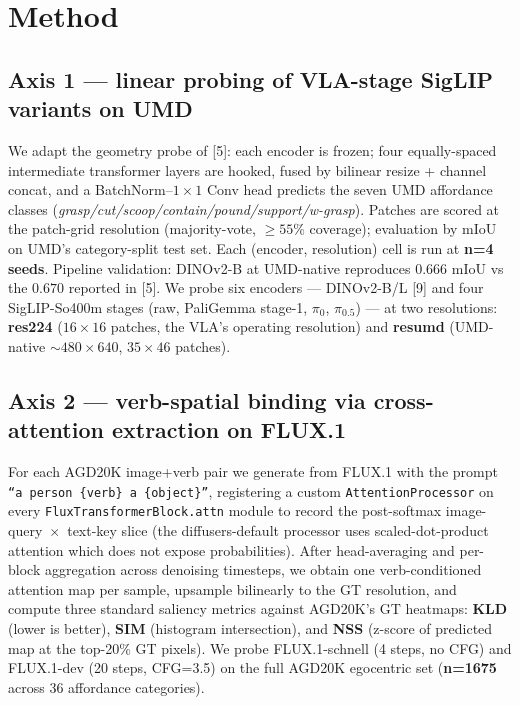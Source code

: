 \documentclass[11pt,letterpaper]{article}
\begin{document}
\section{Method}

\subsection{Axis 1 — linear probing of VLA-stage SigLIP variants on UMD}
We adapt the geometry probe of [5]: each encoder is frozen; four equally-spaced intermediate transformer layers are hooked, fused by bilinear resize + channel concat, and a BatchNorm--$1{\times}1$ Conv head predicts the seven UMD affordance classes (\emph{grasp/cut/scoop/contain/pound/support/w-grasp}). Patches are scored at the patch-grid resolution (majority-vote, $\geq 55\%$ coverage); evaluation by mIoU on UMD's category-split test set. Each (encoder, resolution) cell is run at \textbf{n{=}4 seeds}. Pipeline validation: DINOv2-B at UMD-native reproduces $0.666$ mIoU vs the $0.670$ reported in [5]. We probe six encoders --- DINOv2-B/L [9] and four SigLIP-So400m stages (raw, PaliGemma stage-1, $\pi_0$, $\pi_{0.5}$) --- at two resolutions: \textbf{res224} ($16{\times}16$ patches, the VLA's operating resolution) and \textbf{resumd} (UMD-native ${\sim}480{\times}640$, $35{\times}46$ patches).

\subsection{Axis 2 — verb-spatial binding via cross-attention extraction on FLUX.1}
For each AGD20K image+verb pair we generate from FLUX.1 with the prompt \texttt{``a person \{verb\} a \{object\}''}, registering a custom \texttt{AttentionProcessor} on every \texttt{FluxTransformerBlock.attn} module to record the post-softmax image-query~$\times$~text-key slice (the diffusers-default processor uses scaled-dot-product attention which does not expose probabilities). After head-averaging and per-block aggregation across denoising timesteps, we obtain one verb-conditioned attention map per sample, upsample bilinearly to the GT resolution, and compute three standard saliency metrics against AGD20K's GT heatmaps: \textbf{KLD} (lower is better), \textbf{SIM} (histogram intersection), and \textbf{NSS} (z-score of predicted map at the top-20\% GT pixels). We probe FLUX.1-schnell (4 steps, no CFG) and FLUX.1-dev (20 steps, CFG=3.5) on the full AGD20K egocentric set (\textbf{n{=}1675} across 36 affordance categories).
\end{document}
